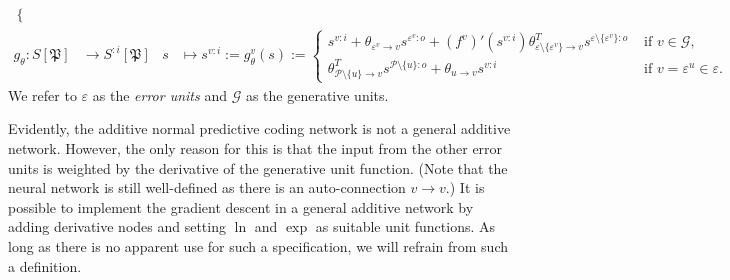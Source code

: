 \documentclass[a4paper,11pt]{report}
\begin{document}
\begin{The}
\begin{equation}
\begin{aligned}
\begin{cases}
\end{cases}\\
g_{\theta}:S[\mathfrak{P}]&\to S^{:i}[\mathfrak{P}]
&
s&\mapsto s^{v:i}:=g^v_{\theta}(s):=\begin{cases}
s^{v:i}+\theta_{\varepsilon^v\to v}s^{\varepsilon^v:o}+\left(f^v\right)'(s^{v:i})\theta_{\varepsilon\setminus\{\varepsilon^v\}\to v}^Ts^{\varepsilon\setminus\{\varepsilon^v\}:o}&\text{ if }v\in\mathcal{G},\\
\theta_{\mathcal{P}\setminus\{u\}\to v}^Ts^{\mathcal{P}\setminus\{u\}:o}+\theta_{u\to v}s^{v:i}&\text{ if }v=\varepsilon^u\in\varepsilon.
\end{cases}
\end{aligned}
\end{equation}
We refer to $\varepsilon$ as the \emph{error units} and $\mathcal{G}$ as the generative units.
\end{The}

\begin{Par}
Evidently, the additive normal predictive coding network is not a general additive network. However, the only reason for this is that the input from the other error units is weighted by the derivative of the generative unit function. (Note that the neural network is still well-defined as there is an auto-connection $v\to v$.) It is possible to implement the gradient descent in a general additive network by adding derivative nodes and setting $\ln$ and $\exp$ as suitable unit functions. As long as there is no apparent use for such a specification, we will refrain from such a definition.
\end{Par}
\end{document}
